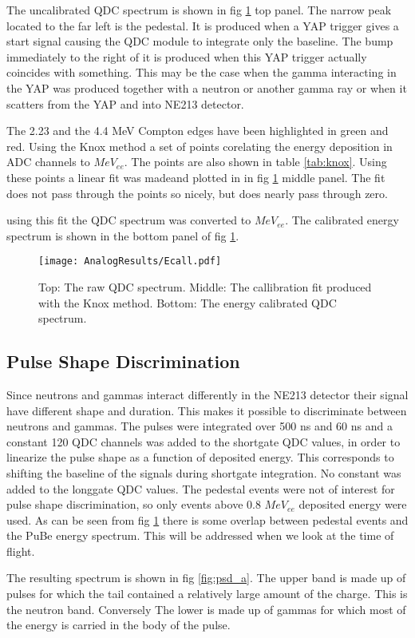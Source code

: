 \documentclass[main.tex]{subfiles}
\begin{document}
The uncalibrated QDC spectrum is shown in fig \ref{fig:qdc_a} top panel. The narrow peak located to the far left is the pedestal. It is produced when a YAP trigger gives a start signal causing the QDC module to integrate only the baseline. The bump immediately to the right of it is produced when this YAP trigger actually coincides with something. This may be the case when the gamma interacting in the YAP was produced together with a neutron or another gamma ray or when it scatters from the YAP and into NE213 detector.

The 2.23 and the 4.4 MeV Compton edges have been highlighted in green and red. Using the Knox method a set of points corelating the energy deposition in ADC channels to $MeV_{ee}$. The points are also shown in table \ref{tab:knox}. Using these points a linear fit was madeand plotted in in fig \ref{fig:qdc_a} middle panel. The fit does not pass through the points so nicely, but does nearly pass through zero.

using this fit the QDC spectrum was converted to $MeV_{ee}$. The calibrated energy spectrum is shown in the bottom panel of fig \ref{fig:qdc_a}.
\begin{figure}[ht!]
    \centering
        \texttt{[image: AnalogResults/Ecall.pdf]}
        \caption{Top: The raw QDC spectrum. Middle: The callibration fit produced with the Knox method. Bottom: The energy calibrated QDC spectrum.}
    \label{fig:qdc_a}
\end{figure}
\clearpage
\subsection{Pulse Shape Discrimination}
Since neutrons and gammas interact differently in the NE213 detector their signal have different shape and duration. This makes it possible to discriminate between neutrons and gammas. The pulses were integrated over 500 ns and 60 ns and a constant 120 QDC channels was added to the shortgate QDC values, in order to linearize the pulse shape as a function of deposited energy. This corresponds to shifting the baseline of the signals during shortgate integration. No constant was added to the longgate QDC values. The pedestal events were not of interest for pulse shape discrimination,  so only events above 0.8 $MeV_{ee}$ deposited energy were used. As can be seen from fig \ref{fig:qdc_a} there is some overlap between pedestal events and the PuBe energy spectrum. This will be addressed when we look at the time of flight.

The resulting spectrum is shown in fig \ref{fig:psd_a}. The upper band is made up of pulses for which the tail contained a relatively large amount of the charge. This is the neutron band. Conversely The lower is made up of gammas for which most of the energy is carried in the body of the pulse. 
\end{document}
